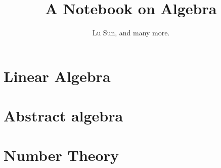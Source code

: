 

\makeindex



\frontmatter

\title{A Notebook on Algebra}
\author{Lu Sun, and many more.}

\maketitle


\tableofcontents


\listoffigures
\listoftables

\mainmatter

\part{Linear Algebra}

\part{Abstract algebra}



\part{Number Theory}




\printindex


